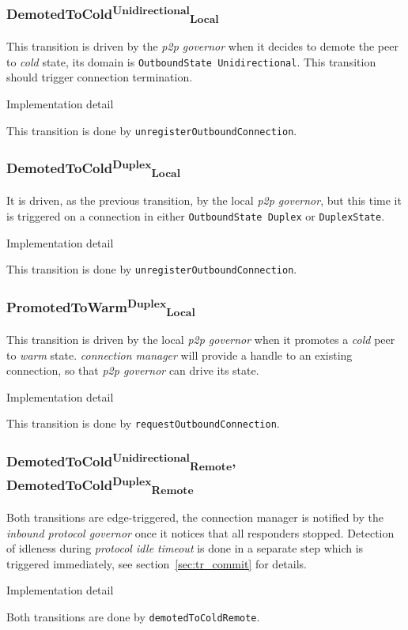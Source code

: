 \documentclass{article}
\def\OutboundStateUni{\texttt{OutboundState\phantom{\textsuperscript{$\tau$}} Unidirectional}}
\def\OutboundStateDup{\texttt{OutboundState\phantom{\textsuperscript{$\tau$}} Duplex}}
\def\DuplexState{\texttt{DuplexState}}
\def\PromotedToWarmDupLoc{\textsf{PromotedToWarm}\textsuperscript{\textsf{Duplex}}\textsubscript{\textsf{Local}}}
\def\DemotedToColdDupLoc{\textsf{DemotedToCold}\textsuperscript{\textsf{Duplex}}\textsubscript{\textsf{Local}}}
\def\DemotedToColdDupRem{\textsf{DemotedToCold}\textsuperscript{\textsf{Duplex}}\textsubscript{\textsf{Remote}}}
\def\DemotedToColdUniLoc{\textsf{DemotedToCold}\textsuperscript{\textsf{Unidirectional}}\textsubscript{\textsf{Local}}}
\def\DemotedToColdUniRem{\textsf{DemotedToCold}\textsuperscript{\textsf{Unidirectional}}\textsubscript{\textsf{Remote}}}
\def\cold{\textit{cold}}
\def\warm{\textit{warm}}
\def\ptopgov{\textit{p2p governor}}
\def\inbgov{\textit{inbound protocol governor}}
\def\connmngr{\textit{connection manager}}
\newenvironment{detail}
  {
    \begin{center}
    \begin{minipage}{0.9\textwidth}
      \begin{shaded}
      \small
      \noindent Implementation detail
      \vspace{0.3em}
      \newline
      \itshape
  }
  {
  \end{shaded}
  \end{minipage}
  \end{center}
  \vspace{1em}
  }
\begin{document}
\subsubsection{\DemotedToColdUniLoc{}}
This transition is driven by the \ptopgov{} when it decides to demote the peer
to \cold{} state, its domain is \OutboundStateUni{}.  This transition should
trigger connection termination.

\begin{detail}
This transition is done by \texttt{unregisterOutboundConnection}.
\end{detail}


\subsubsection{\DemotedToColdDupLoc{}}
It is driven, as the previous transition, by the local \ptopgov{}, but this time it is
triggered on a connection in either \OutboundStateDup{} or \DuplexState{}.

\begin{detail}
This transition is done by \texttt{unregisterOutboundConnection}.
\end{detail}


\subsubsection{\PromotedToWarmDupLoc{}}
This transition is driven by the local \ptopgov{} when it promotes a \cold{} peer
to \warm{} state.  \connmngr{} will provide a handle to an existing connection, so that
\ptopgov{} can drive its state.

\begin{detail}
This transition is done by \texttt{requestOutboundConnection}.
\end{detail}


\subsubsection{\DemotedToColdUniRem{}, \DemotedToColdDupRem{}}
Both transitions are edge-triggered, the connection manager is notified by the
\inbgov{} once it notices that all responders stopped.  Detection of idleness
during \textit{protocol idle timeout} is done in a separate step which is
triggered immediately, see section~\ref{sec:tr_commit} for details.

\begin{detail}
  Both transitions are done by \texttt{demotedToColdRemote}.
\end{detail}
\end{document}
